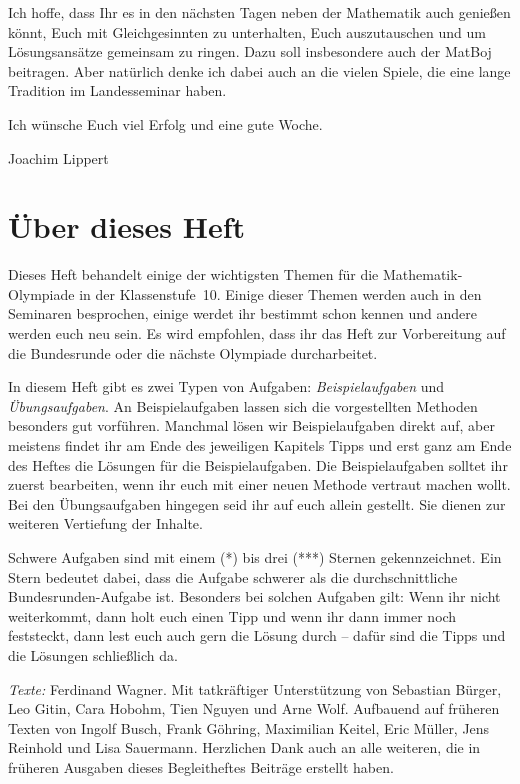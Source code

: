 \documentclass[a4paper, 12pt]{article}
\begin{document}
	Ich hoffe, dass Ihr es in den nächsten Tagen neben der Mathematik auch genießen könnt, Euch mit Gleichgesinnten zu unterhalten, Euch auszutauschen und um Lösungsansätze gemeinsam zu ringen. Dazu soll insbesondere auch der MatBoj beitragen. Aber natürlich denke ich dabei auch an die vielen Spiele, die eine lange Tradition im Landesseminar haben.
	
	Ich wünsche Euch viel Erfolg und eine gute Woche.
	
	Joachim Lippert
	
	\section*{Über dieses Heft}
	Dieses Heft behandelt einige der wichtigsten Themen für die Mathematik-Olympiade in der Klassenstufe~10. Einige dieser Themen werden auch in den Seminaren besprochen, einige werdet ihr bestimmt schon kennen und andere werden euch neu sein. Es wird empfohlen, dass ihr das Heft zur Vorbereitung auf die Bundesrunde oder die nächste Olympiade durcharbeitet.
	
	In diesem Heft gibt es zwei Typen von Aufgaben: \emph{Beispielaufgaben} und \emph{Übungsaufgaben}. An Beispielaufgaben lassen sich die vorgestellten Methoden besonders gut vorführen. Manchmal lösen wir Beispielaufgaben direkt auf, aber meistens findet ihr am Ende des jeweiligen Kapitels Tipps und erst ganz am Ende des Heftes die Lösungen für die Beispielaufgaben. Die Beispielaufgaben solltet ihr zuerst bearbeiten, wenn ihr euch mit einer neuen Methode vertraut machen wollt. Bei den Übungsaufgaben hingegen seid ihr auf euch allein gestellt. Sie dienen zur weiteren Vertiefung der Inhalte.
	
	Schwere Aufgaben sind mit einem (*) bis drei (***) Sternen gekennzeichnet. Ein Stern bedeutet dabei, dass die Aufgabe schwerer als die durchschnittliche Bundesrunden-Aufgabe ist. Besonders bei solchen Aufgaben gilt: Wenn ihr nicht weiterkommt, dann holt euch einen Tipp und wenn ihr dann immer noch feststeckt, dann lest euch auch gern die Lösung durch -- dafür sind die Tipps und die Lösungen schließlich da.
	
	
	\vfill
	
	\scriptsize
	
	\emph{Texte:} Ferdinand Wagner. Mit tatkräftiger Unterstützung von Sebastian Bürger, Leo Gitin, Cara Hobohm, Tien Nguyen und Arne Wolf. Aufbauend auf früheren Texten von Ingolf Busch, Frank Göhring, Maximilian Keitel, Eric Müller, Jens Reinhold und Lisa Sauermann. Herzlichen Dank auch an alle weiteren, die in früheren Ausgaben dieses Begleitheftes Beiträge erstellt haben.
	
\end{document}
